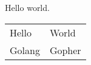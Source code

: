 \documentclass[a4paper,12pt]{article}
\begin{document}
Hello world.
\begin{tabu} to \textwidth {X[1,l]X[1,l]}
  \color{black} Hello &  \color{black} World \\
  \color{black} Golang &  \color{black} Gopher \\
\end{tabu}
\end{document}
